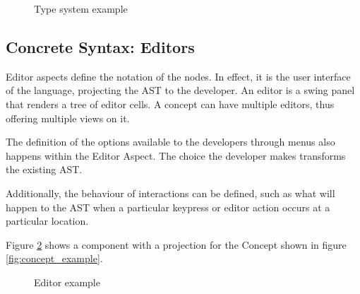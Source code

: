 \begin{figure}[h]
    \centering
    \caption{Type system example}
    \label{fig:typesystem_example}
\end{figure}

\subsection{Concrete Syntax: Editors}
Editor aspects define the notation of the nodes.
In effect, it is the user interface of the language, projecting the AST to the developer.
An editor is a swing panel that renders a tree of editor cells.
A concept can have multiple editors, thus offering multiple views on it.

The definition of the options available to the developers through menus also happens within the Editor Aspect. 
The choice the developer makes transforms the existing AST.

Additionally, the behaviour of interactions can be defined, such as what will happen to the AST when a particular keypress or editor action occurs at a particular location.

Figure \ref{fig:editor_example} shows a component with a projection for the Concept shown in figure \ref{fig:concept_example}.

\begin{figure}[h]
    \centering
    \caption{Editor example}
    \label{fig:editor_example}
\end{figure}


